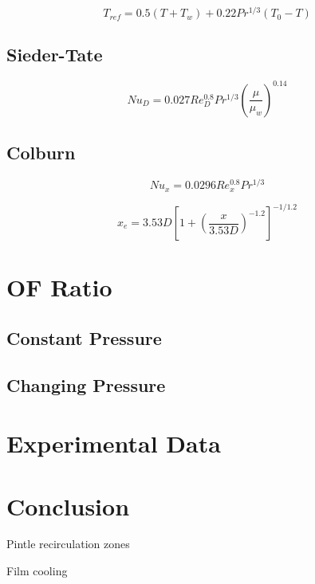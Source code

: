 \documentclass[11pt]{article}
\begin{document}
\begin{equation}
  T_{ref} = 0.5(T + T_w) + 0.22 Pr^{1/3}(T_0 - T)
\end{equation}

\subsection{Sieder-Tate}

\begin{equation}
  Nu_{D} = 0.027 Re_{D}^{0.8} Pr^{1/3} \left( \frac{\mu}{\mu_w} \right)^{0.14}
\end{equation}

\subsection{Colburn}

\begin{equation}
  Nu_x = 0.0296 Re_x^{0.8} Pr^{1/3}
\end{equation}

\begin{equation}
  x_e = 3.53D \left[ 1 + \left( \frac{x}{3.53D} \right)^{-1.2}\right]^{-1/1.2}
\end{equation}

\section{OF Ratio}

\subsection{Constant Pressure}

\subsection{Changing Pressure}

\section{Experimental Data}


\section{Conclusion}

Pintle recirculation zones

Film cooling
\end{document}
